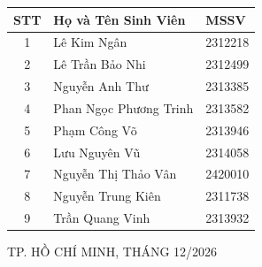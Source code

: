 \begin{titlepage}
\begin{center}
\vspace{0.18cm}
{\fontsize{13.5}{14.5}\selectfont
\renewcommand{\arraystretch}{1.4}
\setlength{\tabcolsep}{8pt}
\begin{tabular}{|c|p{5.8cm}<{\centering}|p{3.2cm}<{\centering}|}
\hline
\textbf{STT} & \textbf{Họ và Tên Sinh Viên} & \textbf{MSSV} \\ \hline
1 & Lê Kim Ngân & 2312218 \\ \hline
2 & Lê Trần Bảo Nhi & 2312499 \\ \hline
3 & Nguyễn Anh Thư & 2313385 \\ \hline
4 & Phan Ngọc Phương Trinh & 2313582 \\ \hline
5 & Phạm Công Võ & 2313946 \\ \hline
6 & Lưu Nguyên Vũ & 2314058 \\ \hline
7 & Nguyễn Thị Thảo Vân & 2420010 \\ \hline
8 & Nguyễn Trung Kiên & 2311738 \\ \hline
9 & Trần Quang Vinh & 2313932 \\ \hline
\end{tabular}\par}

\vfill
{\fontsize{12}{15}\selectfont TP. HỒ CHÍ MINH, THÁNG 12/2026\par}
\vspace*{0.2cm}

\end{center}
\end{titlepage}
\restoregeometry
